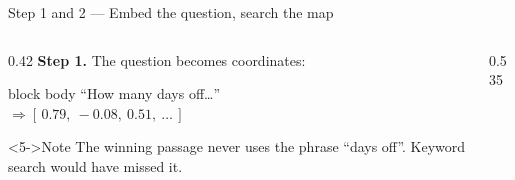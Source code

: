 \documentclass[aspectratio=169,11pt]{beamer}
\begin{document}
\begin{frame}{Step 1 and 2 --- Embed the question, search the map}
  \begin{columns}[T,onlytextwidth]
    \begin{column}{0.42\textwidth}
      \textbf{Step 1.} The question becomes coordinates:
      \smallskip

      \begin{beamercolorbox}[sep=5pt,rounded=true]{block body}
        \small ``How many days off\dots'' \\
        $\Rightarrow [\,0.79,\ -0.08,\ 0.51,\ \dots\,]$
      \end{beamercolorbox}
      \medskip

      \medskip

      \begin{exampleblock}<5->{Note}
        The winning passage never uses the phrase ``days off''.
        Keyword search would have missed it.
      \end{exampleblock}
    \end{column}
    \begin{column}{0.535\textwidth}
      \small{}
      \smallskip


\end{column}
\end{columns}
\end{frame}
\end{document}
